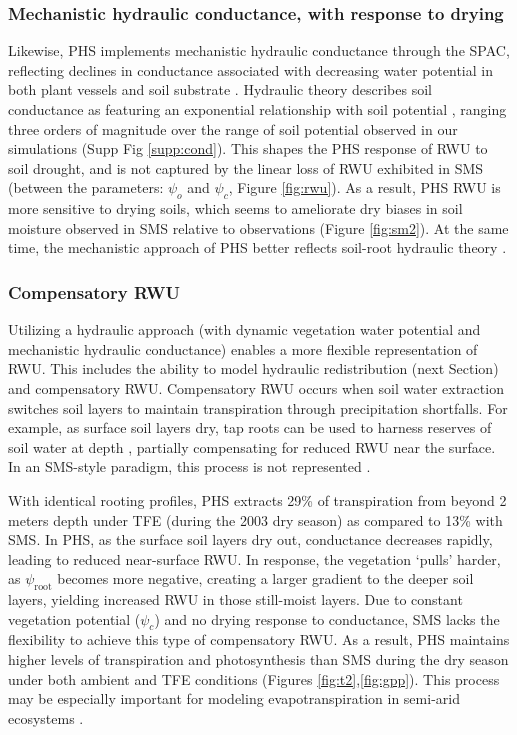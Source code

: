\documentclass[draft,linenumbers]{agujournal}
\begin{document}
\subsubsection{Mechanistic hydraulic conductance, with response to drying}
Likewise, PHS implements mechanistic hydraulic conductance through the SPAC, reflecting declines in conductance associated with decreasing water potential in both plant vessels and soil substrate \citep{tyree1989}.
Hydraulic theory describes soil conductance as featuring an exponential relationship with soil potential \citep{brooks1964}, ranging three orders of magnitude over the range of soil potential observed in our simulations (Supp Fig \ref{supp:cond}).
This shapes the PHS response of RWU to soil drought, and is not captured by the linear loss of RWU exhibited in SMS (between the parameters: $\psi_o$ and $\psi_c$, Figure \ref{fig:rwu}).
As a result, PHS RWU is more sensitive to drying soils, which seems to ameliorate dry biases in soil moisture observed in SMS relative to observations (Figure \ref{fig:sm2}).
At the same time, the mechanistic approach of PHS better reflects soil-root hydraulic theory \citep{cai2018,warren2015}.

\subsubsection{Compensatory RWU}
Utilizing a hydraulic approach (with dynamic vegetation water potential and mechanistic hydraulic conductance) enables a more flexible representation of RWU.
This includes the ability to model hydraulic redistribution (next Section) and compensatory RWU.
Compensatory RWU occurs when soil water extraction switches soil layers to maintain transpiration through precipitation shortfalls.
For example, as surface soil layers dry, tap roots can be used to harness reserves of soil water at depth \citep{oliveira2005}, partially compensating for reduced RWU near the surface.
In an SMS-style paradigm, this process is not represented \citep{jarvis2011}.

With identical rooting profiles, PHS extracts 29\% of transpiration from beyond 2 meters depth under TFE (during the 2003 dry season) as compared to 13\% with SMS.
In PHS, as the surface soil layers dry out, conductance decreases rapidly, leading to reduced near-surface RWU.
In response, the vegetation `pulls' harder, as $\psi_{\text{root}}$ becomes more negative, creating a larger gradient to the deeper soil layers, yielding increased RWU in those still-moist layers.
Due to constant vegetation potential ($\psi_c$) and no drying response to conductance, SMS lacks the flexibility to achieve this type of compensatory RWU.
As a result, PHS maintains higher levels of transpiration and photosynthesis than SMS during the dry season under both ambient and TFE conditions (Figures \ref{fig:t2},\ref{fig:gpp}).
This process may be especially important for modeling evapotranspiration in semi-arid ecosystems \citep{jarvis2011}.
\end{document}
